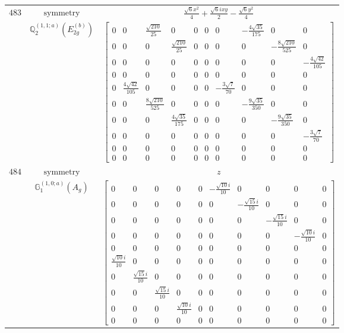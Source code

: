 \documentclass[fleqn,8pt,landscape]{jsarticle}
\begin{document}
\begin{longtable}{ccc}
$ 483 $ & $ \text{symmetry} $ & $ \frac{\sqrt{6} x^{2}}{4} + \frac{\sqrt{6} i x y}{2} - \frac{\sqrt{6} y^{2}}{4} $ \\
$  $ & $ \mathbb{Q}_{2}^{(1,1;a)}(E_{2g}^{(b)}) $ & $ \begin{bmatrix} 0 & 0 & \frac{\sqrt{210}}{25} & 0 & 0 & 0 & 0 & - \frac{4 \sqrt{35}}{175} & 0 & 0 \\ 0 & 0 & 0 & \frac{\sqrt{210}}{25} & 0 & 0 & 0 & 0 & - \frac{8 \sqrt{210}}{525} & 0 \\ 0 & 0 & 0 & 0 & 0 & 0 & 0 & 0 & 0 & - \frac{4 \sqrt{42}}{105} \\ 0 & 0 & 0 & 0 & 0 & 0 & 0 & 0 & 0 & 0 \\ 0 & \frac{4 \sqrt{42}}{105} & 0 & 0 & 0 & 0 & - \frac{3 \sqrt{7}}{70} & 0 & 0 & 0 \\ 0 & 0 & \frac{8 \sqrt{210}}{525} & 0 & 0 & 0 & 0 & - \frac{9 \sqrt{35}}{350} & 0 & 0 \\ 0 & 0 & 0 & \frac{4 \sqrt{35}}{175} & 0 & 0 & 0 & 0 & - \frac{9 \sqrt{35}}{350} & 0 \\ 0 & 0 & 0 & 0 & 0 & 0 & 0 & 0 & 0 & - \frac{3 \sqrt{7}}{70} \\ 0 & 0 & 0 & 0 & 0 & 0 & 0 & 0 & 0 & 0 \\ 0 & 0 & 0 & 0 & 0 & 0 & 0 & 0 & 0 & 0 \end{bmatrix} $ \\ \hline
$ 484 $ & $ \text{symmetry} $ & $ z $ \\
$  $ & $ \mathbb{G}_{1}^{(1,0;a)}(A_{g}) $ & $ \begin{bmatrix} 0 & 0 & 0 & 0 & 0 & - \frac{\sqrt{10} i}{10} & 0 & 0 & 0 & 0 \\ 0 & 0 & 0 & 0 & 0 & 0 & - \frac{\sqrt{15} i}{10} & 0 & 0 & 0 \\ 0 & 0 & 0 & 0 & 0 & 0 & 0 & - \frac{\sqrt{15} i}{10} & 0 & 0 \\ 0 & 0 & 0 & 0 & 0 & 0 & 0 & 0 & - \frac{\sqrt{10} i}{10} & 0 \\ 0 & 0 & 0 & 0 & 0 & 0 & 0 & 0 & 0 & 0 \\ \frac{\sqrt{10} i}{10} & 0 & 0 & 0 & 0 & 0 & 0 & 0 & 0 & 0 \\ 0 & \frac{\sqrt{15} i}{10} & 0 & 0 & 0 & 0 & 0 & 0 & 0 & 0 \\ 0 & 0 & \frac{\sqrt{15} i}{10} & 0 & 0 & 0 & 0 & 0 & 0 & 0 \\ 0 & 0 & 0 & \frac{\sqrt{10} i}{10} & 0 & 0 & 0 & 0 & 0 & 0 \\ 0 & 0 & 0 & 0 & 0 & 0 & 0 & 0 & 0 & 0 \end{bmatrix} $ \\ \hline

\end{longtable}
\end{document}

